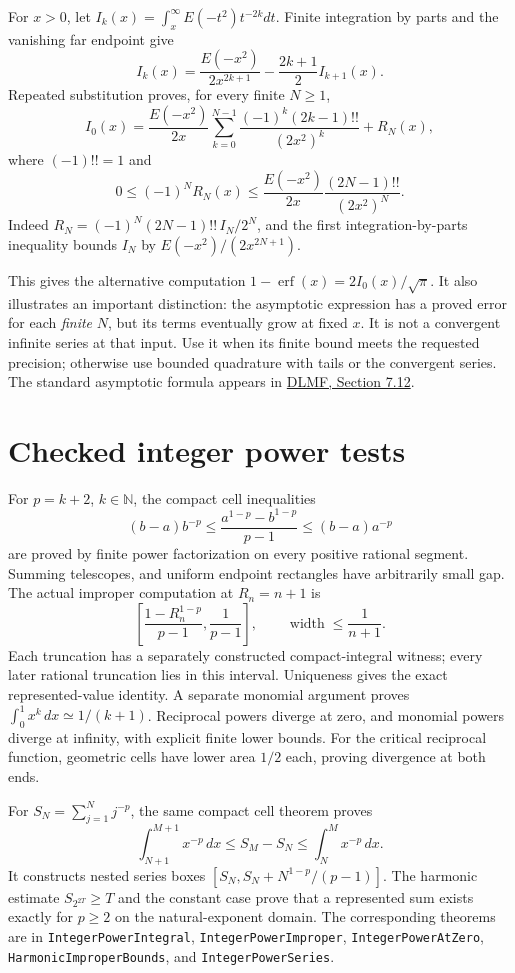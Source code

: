 For $x>0$, let $I_k(x)=\int_x^\infty E(-t^2)t^{-2k}dt$.
Finite integration by parts and the vanishing far endpoint give
\[
 I_k(x)=\frac{E(-x^2)}{2x^{2k+1}}-\frac{2k+1}{2}I_{k+1}(x).
\]
Repeated substitution proves, for every finite $N\ge1$,
\[
 I_0(x)=\frac{E(-x^2)}{2x}
   \sum_{k=0}^{N-1}\frac{(-1)^k(2k-1)!!}{(2x^2)^k}+R_N(x),
\]
where $(-1)!!=1$ and
\[
 0\le(-1)^NR_N(x)
 \le\frac{E(-x^2)}{2x}\frac{(2N-1)!!}{(2x^2)^N}.
\]
Indeed $R_N=(-1)^N(2N-1)!!\,I_N/2^N$, and the first integration-by-parts
inequality bounds $I_N$ by $E(-x^2)/(2x^{2N+1})$.

This gives the alternative computation
$1-\operatorname{erf}(x)=2I_0(x)/\sqrt\pi$.  It also illustrates an
important distinction: the asymptotic expression has a proved error for
each \emph{finite} $N$, but its terms eventually grow at fixed $x$.
It is not a convergent infinite series at that input.  Use it when its
finite bound meets the requested precision; otherwise use bounded
quadrature with tails or the convergent series.  The standard asymptotic
formula appears in \href{https://dlmf.nist.gov/7.12}{DLMF, Section 7.12}.


\section{Checked integer power tests}
\label{sec:integer-power-tests}
For \(p=k+2\), \(k\in\mathbb N\), the compact cell inequalities
\[
(b-a)b^{-p}\le\frac{a^{1-p}-b^{1-p}}{p-1}\le(b-a)a^{-p}
\]
are proved by finite power factorization on every positive rational segment.
Summing telescopes, and uniform endpoint rectangles have arbitrarily small gap.
The actual improper computation at \(R_n=n+1\) is
\[
\left[\frac{1-R_n^{1-p}}{p-1},\frac1{p-1}\right],
\qquad \operatorname{width}\le\frac1{n+1}.
\]
Each truncation has a separately constructed compact-integral witness; every
later rational truncation lies in this interval. Uniqueness gives the exact
represented-value identity. A separate monomial argument proves
\(\int_0^1x^k\,dx\simeq1/(k+1)\).
Reciprocal powers diverge at zero, and monomial powers diverge at infinity,
with explicit finite lower bounds. For the critical reciprocal function,
geometric cells have lower area \(1/2\) each, proving divergence at both ends.

For \(S_N=\sum_{j=1}^N j^{-p}\), the same compact cell theorem proves
\[
\int_{N+1}^{M+1}x^{-p}\,dx\le S_M-S_N\le\int_N^M x^{-p}\,dx.
\]
It constructs nested series boxes
\([S_N,S_N+N^{1-p}/(p-1)]\). The harmonic estimate
\(S_{2^{2T}}\ge T\) and the constant case prove that a represented sum exists
exactly for \(p\ge2\) on the natural-exponent domain.
The corresponding theorems are in \texttt{IntegerPowerIntegral},
\texttt{IntegerPowerImproper}, \texttt{IntegerPowerAtZero},
\texttt{HarmonicImproperBounds}, and \texttt{IntegerPowerSeries}.

